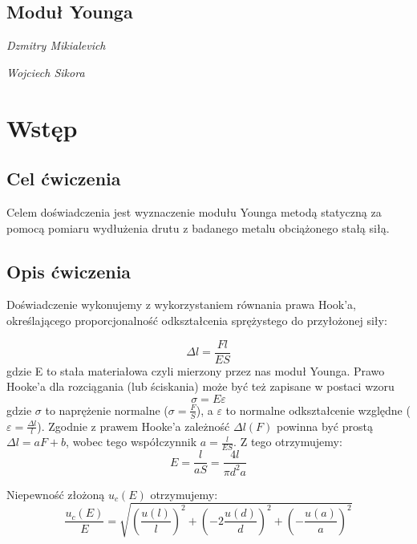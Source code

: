 \documentclass[]{article}
\begin{document}
\begin{figure}[tp!]
\end{figure}

\begin{center}
	\section*{Moduł Younga}
	\emph{Dzmitry Mikialevich}
\end{center}
\begin{center}
	\emph{Wojciech Sikora}
\end{center}
\tableofcontents
\newpage

\section{Wstęp}

\subsection{Cel ćwiczenia}
Celem doświadczenia jest wyznaczenie modułu Younga metodą statyczną za pomocą pomiaru
wydłużenia drutu z badanego metalu obciążonego stałą siłą.

    
\subsection{Opis ćwiczenia}
Doświadczenie wykonujemy z wykorzystaniem równania prawa Hook'a, określającego proporcjonalność odkształcenia sprężystego do przyłożonej siły:
\newline

\[\Delta l = \frac{Fl}{ES} \]
gdzie E to stała materiałowa czyli mierzony przez nas moduł Younga.
\newline
\newline
Prawo Hooke’a dla rozciągania (lub ściskania) może być też zapisane w postaci wzoru
\[\sigma=E\varepsilon\]
gdzie \(\sigma\) to naprężenie normalne (\(\sigma=\frac{F}{S}\)), a \(\varepsilon\) to normalne odkształcenie względne (\(\varepsilon = \frac{\Delta l}{l}\)).
\newline
\newline
Zgodnie z prawem Hooke'a zależność \(\Delta l (F)\) powinna być prostą \(\Delta l = aF + b\), wobec tego współczynnik \(a = \frac{l}{ES}\). Z tego otrzymujemy:
\[E=\frac{l}{aS}=\frac{4l}{\pi d^2 a}\]

Niepewność złożoną \(u_c(E)\) otrzymujemy:
\[\frac{u_c(E)}{E}=\sqrt{(\frac{u(l)}{l})^2+(-2\frac{u(d)}{d})^2+(-\frac{u(a)}{a})^2}\]
\end{document}
